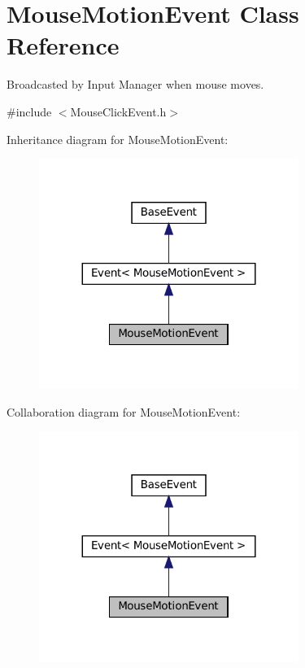 \hypertarget{classMouseMotionEvent}{}\section{Mouse\+Motion\+Event Class Reference}
\label{classMouseMotionEvent}


Broadcasted by Input Manager when mouse moves.  




{\ttfamily \#include $<$Mouse\+Click\+Event.\+h$>$}



Inheritance diagram for Mouse\+Motion\+Event\+:\nopagebreak
\begin{figure}[H]
\begin{center}
\leavevmode
\includegraphics[width=239pt]{classMouseMotionEvent__inherit__graph}
\end{center}
\end{figure}


Collaboration diagram for Mouse\+Motion\+Event\+:\nopagebreak
\begin{figure}[H]
\begin{center}
\leavevmode
\includegraphics[width=239pt]{classMouseMotionEvent__coll__graph}
\end{center}
\end{figure}
